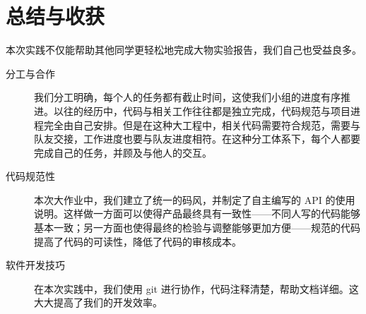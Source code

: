\section{总结与收获}

本次实践不仅能帮助其他同学更轻松地完成大物实验报告，我们自己也受益良多。

\begin{description}
  \item[分工与合作] 我们分工明确，每个人的任务都有截止时间，这使我们小组的进度有序推进。以往的经历中，代码与相关工作往往都是独立完成，代码规范与项目进程完全由自己安排。但是在这种大工程中，相关代码需要符合规范，需要与队友交接，工作进度也要与队友进度相符。在这种分工体系下，每个人都要完成自己的任务，并顾及与他人的交互。
  \item[代码规范性] 本次大作业中，我们建立了统一的码风，并制定了自主编写的 API 的使用说明。这样做一方面可以使得产品最终具有一致性——不同人写的代码能够基本一致；另一方面也使得最终的检验与调整能够更加方便——规范的代码提高了代码的可读性，降低了代码的审核成本。
  \item[软件开发技巧] 在本次实践中，我们使用 git 进行协作，代码注释清楚，帮助文档详细。这大大提高了我们的开发效率。
\end{description}